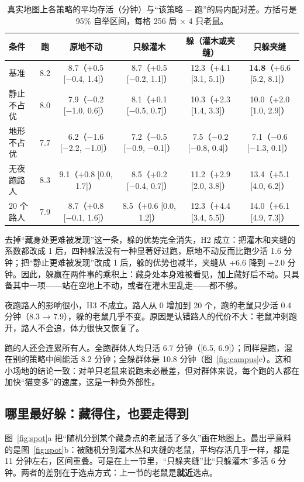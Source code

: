 \documentclass[a4paper,zihao=5,fontset=fandol,UTF8]{ctexart}
\begin{document}
\begin{table}[htbp]
  \centering\small
  \caption{真实地图上各策略的平均存活（分钟）与“该策略 − 跑”的局内配对差。方括号是 95\% 自举区间，每格 256 局 × 4 只老鼠。}
  \label{tab:campus}
  \footnotesize\setlength{\tabcolsep}{2.5pt}
  \begin{tabular}{@{}lccccc@{}}
    \toprule
    条件 & 跑 & 原地不动 & 只躲灌木 & 躲（灌木或夹缝） & 只躲夹缝\\
    \midrule
    基准 & 8.2 & 8.7（+0.5 [−0.4, 1.4]） & 8.7（+0.5 [−0.2, 1.1]） & 12.3（+4.1 [3.1, 5.1]） & \textbf{14.8}（+6.6 [5.2, 8.1]）\\
    静止不占优 & 8.0 & 7.9（−0.2 [−1.0, 0.6]） & 8.1（+0.1 [−0.5, 0.7]） & 10.3（+2.3 [1.4, 3.3]） & 10.0（+2.0 [1.0, 2.9]）\\
    地形不占优 & 7.7 & 6.2（−1.6 [−2.2, −1.0]） & 7.2（−0.5 [−0.9, −0.1]） & 7.5（−0.2 [−0.8, 0.4]） & 7.1（−0.6 [−1.3, 0.1]）\\
    无夜跑路人 & 8.3 & 9.1（+0.8 [0.0, 1.7]） & 8.5（+0.2 [−0.4, 0.7]） & 11.2（+2.9 [2.0, 3.8]） & 13.4（+5.1 [4.0, 6.2]）\\
    20 个路人 & 7.9 & 8.7（+0.8 [−0.1, 1.6]） & 8.5（+0.6 [0.0, 1.2]） & 12.3（+4.4 [3.4, 5.5]） & 14.0（+6.1 [4.9, 7.3]）\\
    \bottomrule
  \end{tabular}
\end{table}

去掉“藏身处更难被发现”这一条，躲的优势完全消失，H2 成立：把灌木和夹缝的系数都改成 1 后，四种躲法没有一种显著好过跑，原地不动反而比跑少活 1.6 分钟；把“静止更难被发现”改成 1 后，躲的优势也减半，夹缝从 +6.6 降到 +2.0 分钟。因此，躲赢在两件事的乘积上：藏身处本身难被看见，加上藏好后不动。只具备其中一项——站在空地上不动，或者在灌木里乱走——都不够。

夜跑路人的影响很小，H3 不成立。路人从 0 增加到 20 个，跑的老鼠只少活 0.4 分钟（8.3 → 7.9），躲的老鼠几乎不变。原因是认错路人的代价不大：老鼠冲刺跑开，路人不会追，体力很快又恢复了。

跑的人还会连累所有人。全跑群体人均只活 6.7 分钟（[6.5, 6.9]）；同样是跑，混在别的策略中间能活 8.2 分钟；全躲群体是 10.8 分钟（图~\ref{fig:campus}c）。这和小场地的结论一致：对单只老鼠来说跑未必最差，但对群体来说，每个跑的人都在加快“猫变多”的速度，这是一种负外部性\cite{hardin1968}。

\subsection{哪里最好躲：藏得住，也要走得到}
图~\ref{fig:spot}a 把“随机分到某个藏身点的老鼠活了多久”画在地图上。最出乎意料的是图~\ref{fig:spot}b：被随机分到灌木丛和夹缝的老鼠，平均存活几乎一样，都是 11 分钟左右，区间重叠。可是在上一节里，“只躲夹缝”比“只躲灌木”多活 6 分钟。两者的差别在于选点方式：上一节的老鼠是\textbf{就近}选点。
\end{document}
